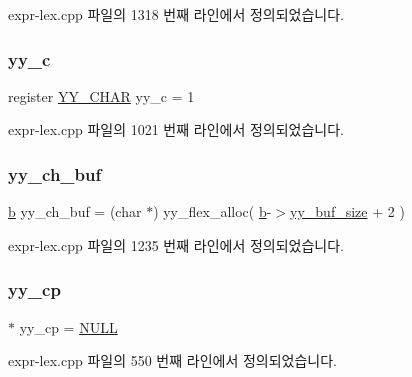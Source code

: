 expr-\/lex.\+cpp 파일의 1318 번째 라인에서 정의되었습니다.

\mbox{\label{expr-lex_8cpp_a2ce7598a28e3deb63b5ef934b031a93f}} 
\subsubsection{\texorpdfstring{yy\+\_\+c}{yy\_c}}
{\footnotesize\ttfamily register \mbox{\hyperlink{expr-lex_8cpp_a1f324b3cb0839eeb90145f0274e6946e}{Y\+Y\+\_\+\+C\+H\+AR}} yy\+\_\+c = 1}



expr-\/lex.\+cpp 파일의 1021 번째 라인에서 정의되었습니다.

\mbox{\label{expr-lex_8cpp_a49f3339224f2ff52f9191b351b184dbd}} 
\subsubsection{\texorpdfstring{yy\+\_\+ch\+\_\+buf}{yy\_ch\_buf}}
{\footnotesize\ttfamily \mbox{\hyperlink{expr-lex_8cpp_a91b64995742fd30063314f12340b4b5a}{b}} yy\+\_\+ch\+\_\+buf = (char $\ast$) yy\+\_\+flex\+\_\+alloc( \mbox{\hyperlink{expr-lex_8cpp_a91b64995742fd30063314f12340b4b5a}{b}}-\/$>$\mbox{\hyperlink{expr-lex_8cpp_a969f40813585d053e9cceaec3fe16f58}{yy\+\_\+buf\+\_\+size}} + 2 )}



expr-\/lex.\+cpp 파일의 1235 번째 라인에서 정의되었습니다.

\mbox{\label{expr-lex_8cpp_aebf8322d98e81db5af081bb22a5f06fe}} 
\subsubsection{\texorpdfstring{yy\+\_\+cp}{yy\_cp}}
{\footnotesize\ttfamily $\ast$ yy\+\_\+cp = \mbox{\hyperlink{_system_8h_a070d2ce7b6bb7e5c05602aa8c308d0c4}{N\+U\+LL}}}



expr-\/lex.\+cpp 파일의 550 번째 라인에서 정의되었습니다.

